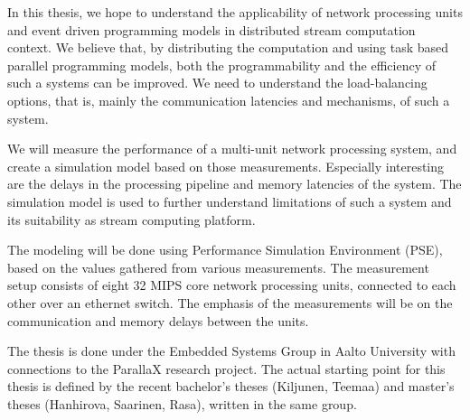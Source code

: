 In this thesis, we hope to understand the applicability of network processing units and event driven programming models in distributed stream computation context. We believe that, by distributing the computation and using task based parallel programming models, both the programmability and the efficiency of such a systems can be improved. We need to understand the load-balancing options, that is, mainly the communication latencies and mechanisms, of such a system.

We will measure the performance of a multi-unit network processing system, and create a simulation model based on those measurements. Especially interesting are the delays in the processing pipeline and memory latencies of the system. The simulation model is used to further understand limitations of such a system and its suitability as stream computing platform.

The modeling will be done using Performance Simulation Environment (PSE), based on the values gathered from various measurements. The measurement setup consists of eight 32 MIPS core network processing units, connected to each other over an ethernet switch. The emphasis of the measurements will be on the communication and memory delays between the units.

The thesis is done under the Embedded Systems Group in Aalto University with connections to the ParallaX research project. The actual starting point for this thesis is defined by the recent bachelor's theses (Kiljunen, Teemaa) and master's theses (Hanhirova, Saarinen, Rasa), written in the same group.

